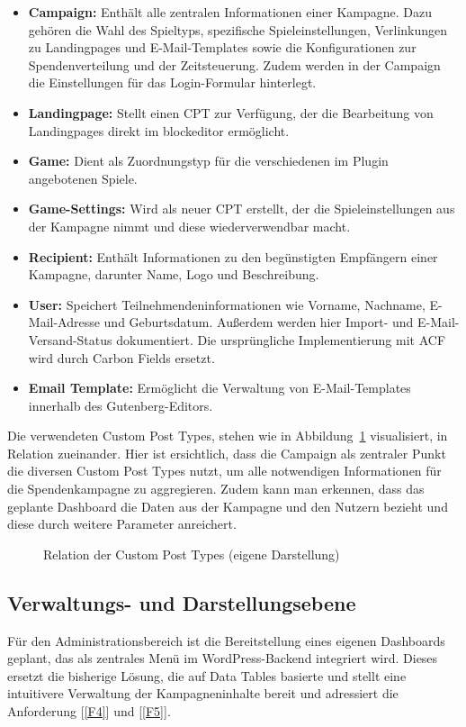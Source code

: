 \begin{itemize}
    \item \textbf{Campaign:} Enthält alle zentralen Informationen einer Kampagne.
    Dazu gehören die Wahl des Spieltyps, spezifische Spieleinstellungen, Verlinkungen zu Landingpages und E-Mail-Templates sowie die Konfigurationen zur Spendenverteilung und der Zeitsteuerung.
    Zudem werden in der Campaign die Einstellungen für das Login-Formular hinterlegt.

    \item \textbf{Landingpage:} Stellt einen CPT zur Verfügung, der die Bearbeitung von Landingpages direkt im \gls{blockeditor} ermöglicht.
    \item \textbf{Game:} Dient als Zuordnungstyp für die verschiedenen im Plugin angebotenen Spiele.
    \item \textbf{Game-Settings:} Wird als neuer CPT erstellt, der die Spieleinstellungen aus der Kampagne nimmt und diese wiederverwendbar macht.
    \item \textbf{Recipient:} Enthält Informationen zu den begünstigten Empfängern einer Kampagne, darunter Name, Logo und Beschreibung.
    \item \textbf{User:} Speichert Teilnehmendeninformationen wie Vorname, Nachname, E-Mail-Adresse und Geburtsdatum.
    Außerdem werden hier Import- und E-Mail-Versand-Status dokumentiert.
    Die ursprüngliche Implementierung mit ACF wird durch Carbon Fields ersetzt.
    \item \textbf{Email Template:} Ermöglicht die Verwaltung von E-Mail-Templates innerhalb des Gutenberg-Editors.
\end{itemize}

Die verwendeten Custom Post Types, stehen wie in Abbildung~\ref{fig:datenmodell} visualisiert, in Relation zueinander.
Hier ist ersichtlich, dass die Campaign als zentraler Punkt die diversen Custom Post Types nutzt, um alle notwendigen Informationen für die Spendenkampagne zu aggregieren.
Zudem kann man erkennen, dass das geplante Dashboard die Daten aus der Kampagne und den Nutzern bezieht und diese durch weitere Parameter anreichert.
\begin{figure}[H]
    \centering
    
    \caption{Relation der Custom Post Types (eigene Darstellung)}
    \label{fig:datenmodell}
\end{figure}


\subsection{Verwaltungs- und Darstellungsebene}
Für den Administrationsbereich ist die Bereitstellung eines eigenen Dashboards geplant, das als zentrales Menü im WordPress-Backend integriert wird.
Dieses ersetzt die bisherige Lösung, die auf Data Tables basierte und stellt eine intuitivere Verwaltung der Kampagneninhalte bereit und adressiert die Anforderung [\ref{F4}] und [\ref{F5}].

